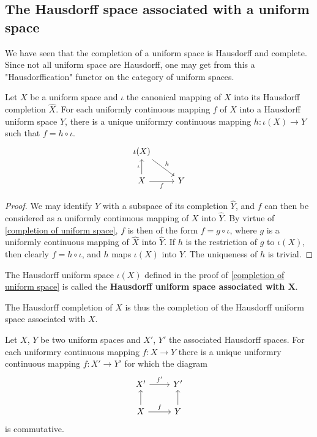\subsection{The Hausdorff space associated with a uniform space}
We have seen that the completion of a uniform space is Hausdorff and complete. Since not all uniform space are Hausdorff, one may get from this a "Hausdorffication" functor on the category of uniform spaces.
\begin{proposition}\label{uniform space Hausdorffication prop}
Let $X$ be a uniform space and $\iota$ the canonical mapping of $X$ into its Hausdorff completion $\widehat{X}$. For each uniformly continuous mapping $f$ of $X$ into a Hausdorff uniform space $Y$, there is a unique uniformry continuous mapping $h:\iota(X)\to Y$ such that $f=h\circ\iota$.
\[\begin{tikzcd}
\iota(X)\ar[rd,"h"]&\\
X\ar[u,"\iota"]\ar[r,swap,"f"]&Y
\end{tikzcd}\]
\end{proposition}
\begin{proof}
We may identify $Y$ with a subspace of its completion $\widehat{Y}$, and $f$ can then be considered as a uniformly continuous mapping of $X$ into $\widehat{Y}$. By virtue of \cref{completion of uniform space}, $f$ is then of the form $f=g\circ\iota$, where $g$ is a uniformly continuous mapping of $\widehat{X}$ into $\widehat{Y}$. If $h$ is the restriction of $g$ to $\iota(X)$, then clearly $f=h\circ\iota$, and $h$ maps $\iota(X)$ into $Y$. The uniqueness of $h$ is trivial.
\end{proof}
\begin{definition}
The Hausdorff uniform space $\iota(X)$ defined in the proof of \cref{completion of uniform space} is called the \textbf{Hausdorff uniform space associated with $\bm{X}$}.
\end{definition}
The Hausdorff completion of $X$ is thus the completion of the Hausdorff uniform space associated with $X$.
\begin{corollary}
Let $X$, $Y$ be two uniform spaces and $X'$, $Y'$ the associated Hausdorff spaces. For each uniformry continuous mapping $f:X\to Y$ there is a unique uniformry continuous mapping $f:X'\to Y'$ for which the diagram
\[\begin{tikzcd}
X'\ar[r,"f'"]&Y'\\
X\ar[u]\ar[r,"f"]&Y\ar[u]
\end{tikzcd}\]
is commutative.
\end{corollary}
